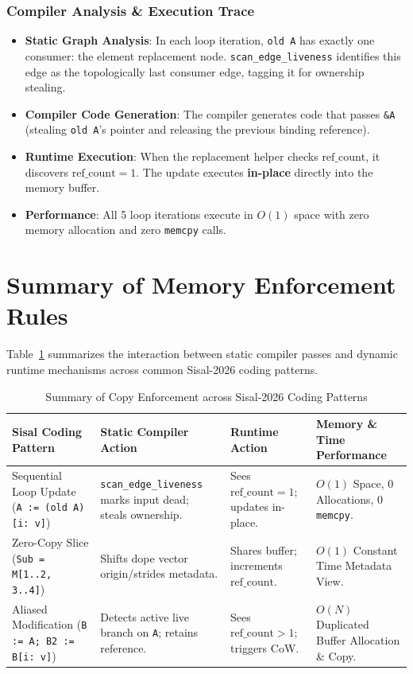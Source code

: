 \subsubsection{Compiler Analysis \& Execution Trace}
\begin{itemize}
    \item \textbf{Static Graph Analysis}: In each loop iteration, \texttt{old A} has exactly one consumer: the element replacement node. \texttt{scan\_edge\_liveness} identifies this edge as the topologically last consumer edge, tagging it for ownership stealing.
    \item \textbf{Compiler Code Generation}: The compiler generates code that passes \texttt{\&A} (stealing \texttt{old A}'s pointer and releasing the previous binding reference).
    \item \textbf{Runtime Execution}: When the replacement helper checks $\text{ref\_count}$, it discovers $\text{ref\_count} = 1$. The update executes \textbf{in-place} directly into the memory buffer.
    \item \textbf{Performance}: All 5 loop iterations execute in $O(1)$ space with zero memory allocation and zero \texttt{memcpy} calls.
\end{itemize}

\section{Summary of Memory Enforcement Rules}
Table~\ref{tab:copy_summary} summarizes the interaction between static compiler passes and dynamic runtime mechanisms across common Sisal-2026 coding patterns.

\begin{table}[h!]
\centering
\caption{Summary of Copy Enforcement across Sisal-2026 Coding Patterns}
\label{tab:copy_summary}
\begin{tabularx}{\textwidth}{X p{3.2cm} p{3.2cm} X}
\toprule
\textbf{Sisal Coding Pattern} & \textbf{Static Compiler Action} & \textbf{Runtime Action} & \textbf{Memory \& Time Performance} \\
\midrule
Sequential Loop Update (\texttt{A := (old A)[i: v]}) & \texttt{scan\_edge\_liveness} marks input dead; steals ownership. & Sees $\text{ref\_count} = 1$; updates in-place. & $O(1)$ Space, $0$ Allocations, $0$ \texttt{memcpy}. \\
\midrule
Zero-Copy Slice (\texttt{Sub = M[1..2, 3..4]}) & Shifts dope vector origin/strides metadata. & Shares buffer; increments $\text{ref\_count}$. & $O(1)$ Constant Time Metadata View. \\
\midrule
Aliased Modification (\texttt{B := A; B2 := B[i: v]}) & Detects active live branch on \texttt{A}; retains reference. & Sees $\text{ref\_count} > 1$; triggers CoW. & $O(N)$ Duplicated Buffer Allocation \& Copy. \\
\bottomrule
\end{tabularx}
\end{table}
